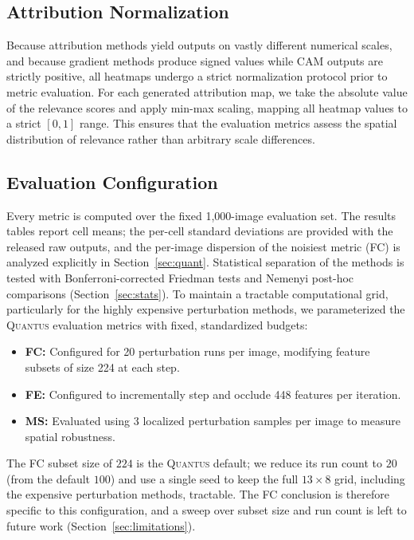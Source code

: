 \documentclass[final,5p,times,twocolumn]{elsarticle}
\begin{document}
\subsection{Attribution Normalization}
Because attribution methods yield outputs on vastly different numerical scales, and because gradient methods produce signed values while CAM outputs are strictly positive, all heatmaps undergo a strict normalization protocol prior to metric evaluation. For each generated attribution map, we take the absolute value of the relevance scores and apply min-max scaling, mapping all heatmap values to a strict $[0, 1]$ range. This ensures that the evaluation metrics assess the spatial distribution of relevance rather than arbitrary scale differences.

\subsection{Evaluation Configuration}
Every metric is computed over the fixed 1,000-image evaluation set. The results tables report cell means; the per-cell standard deviations are provided with the released raw outputs, and the per-image dispersion of the noisiest metric (FC) is analyzed explicitly in Section~\ref{sec:quant}. Statistical separation of the methods is tested with Bonferroni-corrected Friedman tests and Nemenyi post-hoc comparisons (Section~\ref{sec:stats}). To maintain a tractable computational grid, particularly for the highly expensive perturbation methods, we parameterized the \textsc{Quantus} evaluation metrics with fixed, standardized budgets:
\begin{itemize}
    \item \textbf{FC:} Configured for 20 perturbation runs per image, modifying feature subsets of size 224 at each step.
    \item \textbf{FE:} Configured to incrementally step and occlude 448 features per iteration.
    \item \textbf{MS:} Evaluated using 3 localized perturbation samples per image to measure spatial robustness.
\end{itemize}
The FC subset size of $224$ is the \textsc{Quantus} default; we reduce its run count to $20$ (from the default $100$) and use a single seed to keep the full $13\times8$ grid, including the expensive perturbation methods, tractable. The FC conclusion is therefore specific to this configuration, and a sweep over subset size and run count is left to future work (Section~\ref{sec:limitations}).
\end{document}
